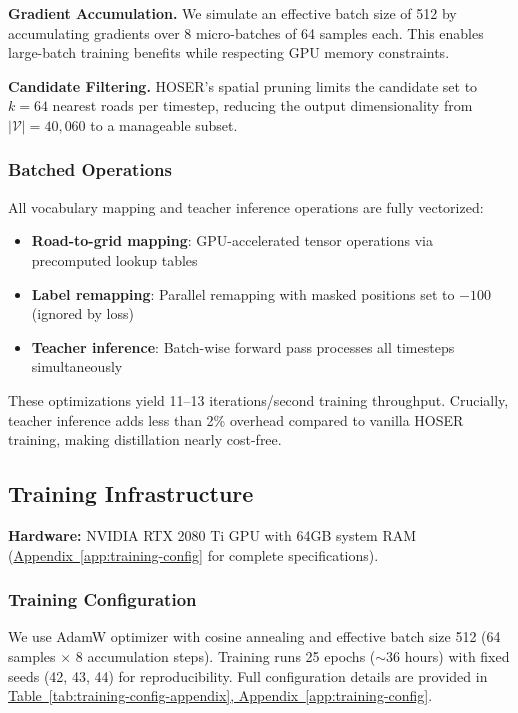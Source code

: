 \textbf{Gradient Accumulation.} We simulate an effective batch size of 512 by accumulating gradients over 8 micro-batches of 64 samples each. This enables large-batch training benefits while respecting GPU memory constraints.

\textbf{Candidate Filtering.} HOSER's spatial pruning limits the candidate set to $k = 64$ nearest roads per timestep, reducing the output dimensionality from $|\mathcal{V}| = 40{,}060$ to a manageable subset.

\subsubsection{Batched Operations}

All vocabulary mapping and teacher inference operations are fully vectorized:

\begin{itemize}[noitemsep,topsep=0pt]
    \item \textbf{Road-to-grid mapping}: GPU-accelerated tensor operations via precomputed lookup tables
    \item \textbf{Label remapping}: Parallel remapping with masked positions set to $-100$ (ignored by loss)
    \item \textbf{Teacher inference}: Batch-wise forward pass processes all timesteps simultaneously
\end{itemize}

These optimizations yield 11--13 iterations/second training throughput. Crucially, teacher inference adds less than 2\% overhead compared to vanilla HOSER training, making distillation nearly cost-free.

\subsection{Training Infrastructure}
\label{sec:impl-infra}

\textbf{Hardware:} NVIDIA RTX 2080 Ti GPU with 64GB system RAM (\hyperref[app:training-config]{Appendix~\ref*{app:training-config}} for complete specifications).

\subsubsection{Training Configuration}

We use AdamW optimizer with cosine annealing and effective batch size 512 (64 samples $\times$ 8 accumulation steps). Training runs 25 epochs ($\sim$36 hours) with fixed seeds (42, 43, 44) for reproducibility. Full configuration details are provided in \hyperref[app:training-config]{Table~\ref*{tab:training-config-appendix}, Appendix~\ref*{app:training-config}}.

